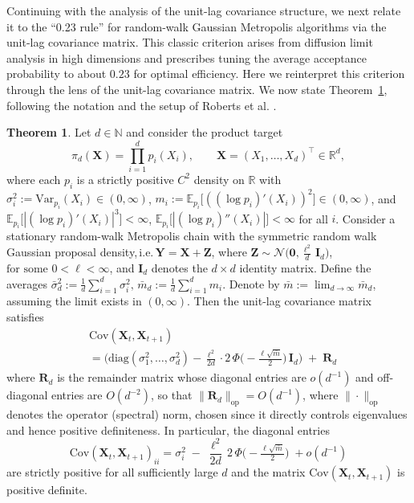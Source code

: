 \documentclass[conference]{IEEEtran}
\theoremstyle{definition}
\newtheorem{theorem}{Theorem}[section]
\begin{document}
Continuing with the analysis of the unit-lag covariance structure, we next relate it to the ``0.23 rule'' for random-walk Gaussian Metropolis algorithms via the unit-lag covariance matrix. This classic criterion arises from diffusion limit analysis in high dimensions \cite{RobertsandGelman} and prescribes tuning the average acceptance probability to about $0.23$ for optimal efficiency. Here we reinterpret this criterion through the lens of the unit-lag covariance matrix.
We now state Theorem~\ref{0.23}, following the notation and the setup of Roberts et al. \cite{RobertsandGelman}.

\begin{theorem}\label{0.23}
Let $d\in\mathbb{N}$ and consider the product target
\[
\pi_d(\boldsymbol{X})=\prod_{i=1}^d p_i(X_i),\qquad \boldsymbol{X}=(X_1,\dots,X_d)^\top\in\mathbb{R}^d,
\]
where each $p_i$ is a strictly positive $C^2$ density on $\mathbb{R}$ with 
$\sigma_i^2 := \mathrm{Var}_{p_i}(X_i) \in (0, \infty)$, 
$m_i := \mathbb{E}_{p_i}\big[ ( (\log p_i)'(X_i) )^2 \big] \in (0, \infty)$, 
and $\mathbb{E}_{p_i}\big[ | (\log p_i)'(X_i) |^3 \big] < \infty$, 
$\mathbb{E}_{p_i}\big[ | (\log p_i)''(X_i) | \big] < \infty$ for all $i$.
Consider a stationary random-walk Metropolis chain with the symmetric random walk Gaussian proposal density,\,i.e.\,\(\boldsymbol{Y}=\boldsymbol{X}+\boldsymbol{Z}\), where $\boldsymbol{Z}\sim \mathcal N\!\big(\boldsymbol{0},\tfrac{\ell^2}{d}\,\boldsymbol{I}_d\big)$, $\text{for some } 0<\ell<\infty$, 
and $\boldsymbol{I}_d$ denotes the $d\times d$ identity matrix.
Define the averages
\(
\bar\sigma_d^2 := \frac{1}{d}\sum_{i=1}^d \sigma_i^2,\,
\bar m_d := \frac{1}{d}\sum_{i=1}^d m_i.
\) Denote by $\bar m := \lim_{d\to\infty}\bar m_d$, assuming the limit exists in $(0,\infty)$.
Then the unit-lag covariance matrix satisfies
\begin{align}\label{cov matrix formula}
&\mathrm{Cov}(\boldsymbol{X}_t,\boldsymbol{X}_{t+1})\nonumber\\
&= \Big(\mathrm{diag}(\sigma_1^2,\dots,\sigma_d^2)
-\frac{\ell^2}{2d}\cdot2\,\Phi\!\big(-\tfrac{\ell\sqrt{\bar m}}{2}\big)\,\boldsymbol{I}_d\Big)
\;+\; \boldsymbol{R}_d
\end{align}
where $\boldsymbol R_d$ is the remainder matrix whose diagonal entries are $o(d^{-1})$ and off-diagonal entries are $O(d^{-2})$, so that $\|\boldsymbol R_d\|_{\mathrm{op}}=O(d^{-1})$, where $\|\cdot\|_{\mathrm{op}}$ denotes the operator (spectral) norm, chosen since it directly controls eigenvalues and hence positive definiteness. In particular, the diagonal entries
\[
\mathrm{Cov}(\boldsymbol{X}_t,\boldsymbol{X}_{t+1})_{ii}
= \sigma_i^2 \;-\; \frac{\ell^2}{2d}\,2\,\Phi\!\Big(-\tfrac{\ell\sqrt{\bar m}}{2}\Big)\;+o(d^{-1})
\]
are strictly positive for all sufficiently large \(d\) and the matrix $\mathrm{Cov}(\boldsymbol{X}_t,\boldsymbol{X}_{t+1})$ is positive definite.
\end{theorem}
\end{document}
